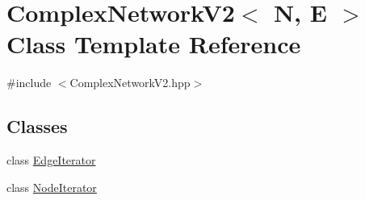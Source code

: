 \hypertarget{class_complex_network_v2}{\section{Complex\+Network\+V2$<$ N, E $>$ Class Template Reference}
\label{class_complex_network_v2}
}


{\ttfamily \#include $<$Complex\+Network\+V2.\+hpp$>$}

\subsection*{Classes}
\begin{DoxyCompactItemize}
\item 
class \hyperlink{class_complex_network_v2_1_1_edge_iterator}{Edge\+Iterator}
\item 
class \hyperlink{class_complex_network_v2_1_1_node_iterator}{Node\+Iterator}
\end{DoxyCompactItemize}
